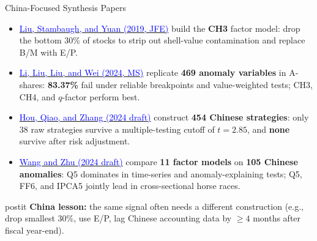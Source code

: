 \documentclass{beamer}
\begin{document}
\begin{frame}{China-Focused Synthesis Papers}
	\begin{itemize}
		\item \href{https://doi.org/10.1016/j.jfineco.2019.03.008}{\textcolor{blue}{Liu, Stambaugh, and Yuan (2019, JFE)}} build the \textbf{CH3} factor model: drop the bottom 30\% of stocks to strip out shell-value contamination and replace B/M with E/P.
		\item \href{https://doi.org/10.1287/mnsc.2023.4904}{\textcolor{blue}{Li, Liu, Liu, and Wei (2024, MS)}} replicate \textbf{469 anomaly variables} in A-shares: \textbf{83.37\%} fail under reliable breakpoints and value-weighted tests; CH3, CH4, and $q$-factor perform best.
		\item \href{https://eng.pbcsf.tsinghua.edu.cn/dfiles/wp6.pdf}{\textcolor{blue}{Hou, Qiao, and Zhang (2024 draft)}} construct \textbf{454 Chinese strategies}: only 38 raw strategies survive a multiple-testing cutoff of $t=2.85$, and \textbf{none} survive after risk adjustment.
		\item \href{https://www.cfrn.com.cn/uploads/master/paper/20240728/66a60a40ddd07.pdf}{\textcolor{blue}{Wang and Zhu (2024 draft)}} compare \textbf{11 factor models} on \textbf{105 Chinese anomalies}: Q5 dominates in time-series and anomaly-explaining tests; Q5, FF6, and IPCA5 jointly lead in cross-sectional horse races.
	\end{itemize}

	\vspace{0.3cm}
	\begin{beamercolorbox}[sep=0.4em,wd=\linewidth,rounded=true,shadow=true]{postit}
		\textbf{China lesson:} the same signal often needs a different construction (e.g., drop smallest 30\%, use E/P, lag Chinese accounting data by $\geq 4$ months after fiscal year-end).
	\end{beamercolorbox}
\end{frame}
\end{document}
